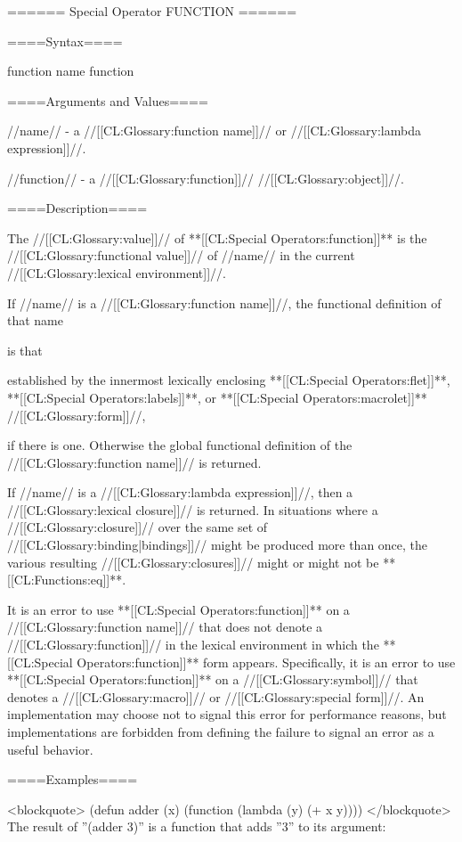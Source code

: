 ====== Special Operator FUNCTION ======

====Syntax====

\DefspecWithValues function {name} {function}

====Arguments and Values====

//name// - a //[[CL:Glossary:function name]]// or //[[CL:Glossary:lambda expression]]//.

//function// - a //[[CL:Glossary:function]]// //[[CL:Glossary:object]]//.

====Description====

The //[[CL:Glossary:value]]// of **[[CL:Special Operators:function]]** is the //[[CL:Glossary:functional value]]// of //name// in the current //[[CL:Glossary:lexical environment]]//.

If //name// is a //[[CL:Glossary:function name]]//, the functional definition of that name

is that

established by the innermost lexically enclosing **[[CL:Special Operators:flet]]**, **[[CL:Special Operators:labels]]**, or **[[CL:Special Operators:macrolet]]** //[[CL:Glossary:form]]//,

if there is one. Otherwise the global functional definition of the //[[CL:Glossary:function name]]// is returned.

If //name// is a //[[CL:Glossary:lambda expression]]//, then a //[[CL:Glossary:lexical closure]]// is returned. In situations where a //[[CL:Glossary:closure]]// over the same set of //[[CL:Glossary:binding|bindings]]// might be produced more than once, the various resulting //[[CL:Glossary:closures]]// might or might not be **[[CL:Functions:eq]]**.

It is an error to use **[[CL:Special Operators:function]]** on a //[[CL:Glossary:function name]]// that does not denote a //[[CL:Glossary:function]]// in the lexical environment in which the **[[CL:Special Operators:function]]** form appears. Specifically, it is an error to use **[[CL:Special Operators:function]]** on a //[[CL:Glossary:symbol]]// that denotes a //[[CL:Glossary:macro]]// or //[[CL:Glossary:special form]]//. An implementation may choose not to signal this error for performance reasons, but implementations are forbidden from defining the failure to signal an error as a useful behavior.

====Examples====

<blockquote> (defun adder (x) (function (lambda (y) (+ x y)))) </blockquote> The result of ''(adder 3)'' is a function that adds ''3'' to its argument:


